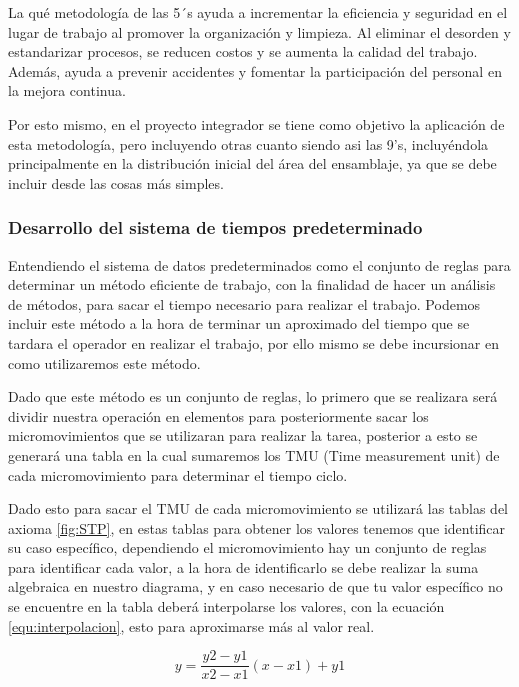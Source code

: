     La qué metodología de las 5´s ayuda a incrementar la eficiencia y seguridad en el lugar de trabajo al promover la organización y limpieza. Al eliminar el desorden y estandarizar procesos, se reducen costos y se aumenta la calidad del trabajo. Además, ayuda a  prevenir accidentes y fomentar la participación del personal en la mejora continua. 
    
    
    Por esto mismo, en el proyecto integrador se tiene como objetivo la aplicación  de esta metodología, pero incluyendo otras cuanto siendo asi las 9's, incluyéndola principalmente en la distribución inicial del área del ensamblaje, ya que se debe incluir desde las cosas más simples.
    
    \subsubsection{Desarrollo del sistema de tiempos predeterminado}
    
    Entendiendo el sistema de datos predeterminados como el conjunto de reglas para determinar un método eficiente de trabajo, con la finalidad de hacer un análisis de métodos, para sacar el tiempo necesario para realizar el trabajo. Podemos incluir este método a la hora de terminar un aproximado del tiempo que se tardara el operador en realizar el trabajo, por ello mismo se debe incursionar en como utilizaremos este método.
    
    Dado que este método es un conjunto de reglas, lo primero que se realizara será dividir nuestra operación en elementos para posteriormente sacar los micromovimientos que se utilizaran para realizar la tarea, posterior a esto se generará una tabla en la cual sumaremos los TMU (Time measurement unit) de cada micromovimiento para determinar el tiempo ciclo.
    
    Dado esto para sacar el TMU de cada micromovimiento se utilizará las tablas del axioma \ref{fig:STP}, en estas tablas para obtener los valores tenemos que identificar su caso específico, dependiendo el micromovimiento hay un conjunto de reglas para identificar cada valor, a la hora de identificarlo se debe realizar la suma algebraica en nuestro diagrama, y en caso necesario de que tu valor específico no se encuentre en la tabla deberá interpolarse los valores, con la ecuación \ref{equ:interpolacion}, esto para aproximarse más al valor real.
    
    
     \begin{equation}
            \label{equ:interpolacion}
           y = \frac{y2-y1}{x2-x1}(x-x1)+y1
        \end{equation}
    
